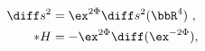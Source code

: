 \begin{equation}
\begin{aligned}
\label{flatNSmetric}
   \diff s^2 &= \ex^{2\Phi}\diff s^2 (\bbR^{4})~, \\
   * H &= - \ex^{2\Phi} \diff (\ex^{-2\Phi}) ,
\end{aligned}
\end{equation}

